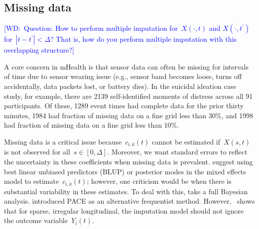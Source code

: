 \documentclass[12pt]{amsart}
\newcommand{\walt}[1]{\textcolor{blue}{[WD:\ #1]}}
\begin{document}
\subsection{Missing data}
\label{section:missingdata}
\walt{Question: How to perform multiple imputation for~$X(\cdot,t)$
  and $X(\cdot, t^\prime)$ for~$|t - t^\prime| <\Delta$? That is, how
  do you perform multiple imputation with this overlapping structure?}

A core concern in mHealth is that sensor data can often be missing for
intervals of time due to sensor wearing issue (e.g., sensor band
becomes loose, turns off accidentally, data packets lost, or battery
dies). In the suicidal ideation case study, for example, there are
2139 self-identified moments of distress across all 91 participants.
Of these, 1289 event times had complete data for the prior thirty
minutes, 1984 had fraction of missing data on a fine grid less than
30\%, and 1998 had fraction of missing data on a fine grid less than
10\%. 

Missing data is a critical issue because~$c_{i,k} (t)$ cannot be
estimated if~$X(s,t)$ is not observed for all~$s \in [0,\Delta]$. 
Moreover, we want standard errors to reflect the uncertainty
in these coefficients when missing data is prevalent.
\cite{Goldsmith2011} suggest using best linear unbiased predictors
(BLUP) or posterior modes in the mixed effects model to
estimate~$c_{i,k} (t)$; however, one criticism would be when there is
substantial variability in these estimates.  To deal with this,
\cite{Crainiceanu2010} take a full Bayesian analysis.
\cite{Yao2005} introduced PACE as an alternative frequentist method.
However,~\cite{Petrovich2018} shows that for sparse, irregular
longitudinal, the imputation model should not ignore the outcome
variable~$Y_i (t)$.
\end{document}
